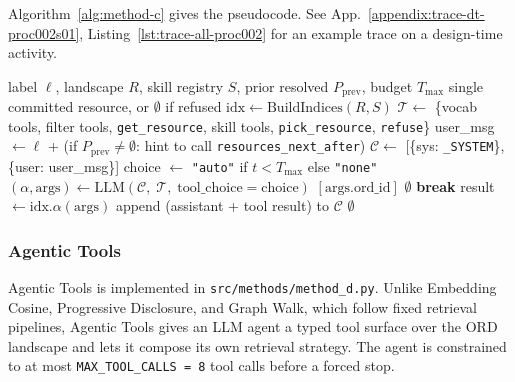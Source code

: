 Algorithm~\ref{alg:method-c} gives the pseudocode. See App.~\ref{appendix:trace-dt-proc002s01}, Listing~\ref{lst:trace-all-proc002} for an example trace on a design-time activity.




\begin{algorithm}[!t]\small
  \caption{Agentic Tools --- typed ORD tools, agentic (\texttt{src/methods/method\_d.py})}
  \label{alg:method-d}
  \begin{algorithmic}[1]
  \REQUIRE label $\ell$, landscape $R$, skill registry $S$, prior resolved $P_{\mathrm{prev}}$, budget $T_{\max}$
  \ENSURE single committed resource, or $\emptyset$ if refused
  \STATE $\mathrm{idx} \leftarrow \mathrm{BuildIndices}(R, S)$ 
  \STATE $\mathcal{T} \leftarrow$ \{vocab tools, filter tools, \texttt{get\_resource}, skill tools, \texttt{pick\_resource}, \texttt{refuse}\}
  \STATE user\_msg $\leftarrow \ell$ + (if $P_{\mathrm{prev}} \neq \emptyset$: hint to call \texttt{resources\_next\_after})
  \STATE $\mathcal{C} \leftarrow$ [\{sys: \texttt{\_SYSTEM}\}, \{user: user\_msg\}]
    \STATE choice $\leftarrow$ \texttt{"auto"} if $t < T_{\max}$ else \texttt{"none"} 
    \STATE $(\alpha, \mathrm{args}) \leftarrow \mathrm{LLM}(\mathcal{C},\; \mathcal{T},\; \mathrm{tool\_choice}=\mathrm{choice})$
      \RETURN $[\mathrm{args.ord\_id}]$ 
      \RETURN $\emptyset$
      \STATE \textbf{break} 
    \ELSE
      \STATE result $\leftarrow \mathrm{idx}.\alpha(\mathrm{args})$ 
      \STATE append (assistant + tool result) to $\mathcal{C}$
    \ENDIF
  \ENDFOR
  \RETURN $\emptyset$ 
  \end{algorithmic}
  \end{algorithm}%


\subsubsection{Agentic Tools}

Agentic Tools is implemented in \texttt{src/methods/method\_d.py}. Unlike Embedding Cosine, Progressive Disclosure, and Graph Walk, which follow fixed retrieval pipelines, Agentic Tools gives an LLM agent a typed tool surface over the ORD landscape and lets it compose its own retrieval strategy. The agent is constrained to at most \texttt{MAX\_TOOL\_CALLS = 8} tool calls before a forced stop.

